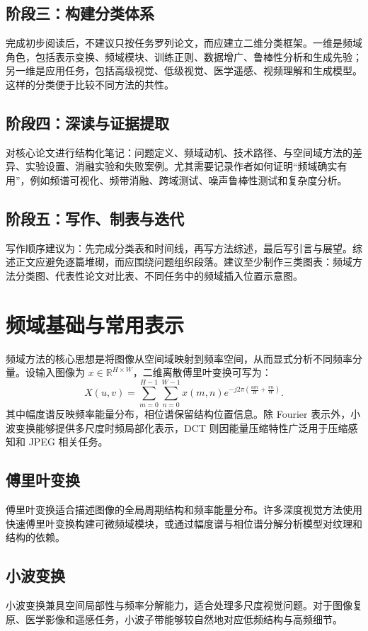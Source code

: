 \documentclass[journal,10pt]{IEEEtran}
\begin{document}
\subsection{阶段三：构建分类体系}
完成初步阅读后，不建议只按任务罗列论文，而应建立二维分类框架。一维是频域角色，包括表示变换、频域模块、训练正则、数据增广、鲁棒性分析和生成先验；另一维是应用任务，包括高级视觉、低级视觉、医学遥感、视频理解和生成模型。这样的分类便于比较不同方法的共性。

\subsection{阶段四：深读与证据提取}
对核心论文进行结构化笔记：问题定义、频域动机、技术路径、与空间域方法的差异、实验设置、消融实验和失败案例。尤其需要记录作者如何证明“频域确实有用”，例如频谱可视化、频带消融、跨域测试、噪声鲁棒性测试和复杂度分析。

\subsection{阶段五：写作、制表与迭代}
写作顺序建议为：先完成分类表和时间线，再写方法综述，最后写引言与展望。综述正文应避免逐篇堆砌，而应围绕问题组织段落。建议至少制作三类图表：频域方法分类图、代表性论文对比表、不同任务中的频域插入位置示意图。

\section{频域基础与常用表示}
频域方法的核心思想是将图像从空间域映射到频率空间，从而显式分析不同频率分量。设输入图像为 $x\in\mathbb{R}^{H\times W}$，二维离散傅里叶变换可写为：
\begin{equation}
X(u,v)=\sum_{m=0}^{H-1}\sum_{n=0}^{W-1}x(m,n)e^{-j2\pi(\frac{um}{H}+\frac{vn}{W})}.
\end{equation}
其中幅度谱反映频率能量分布，相位谱保留结构位置信息。除 Fourier 表示外，小波变换能够提供多尺度时频局部化表示，DCT 则因能量压缩特性广泛用于压缩感知和 JPEG 相关任务。

\subsection{傅里叶变换}
傅里叶变换适合描述图像的全局周期结构和频率能量分布。许多深度视觉方法使用快速傅里叶变换构建可微频域模块，或通过幅度谱与相位谱分解分析模型对纹理和结构的依赖。

\subsection{小波变换}
小波变换兼具空间局部性与频率分解能力，适合处理多尺度视觉问题。对于图像复原、医学影像和遥感任务，小波子带能够较自然地对应低频结构与高频细节。
\end{document}
